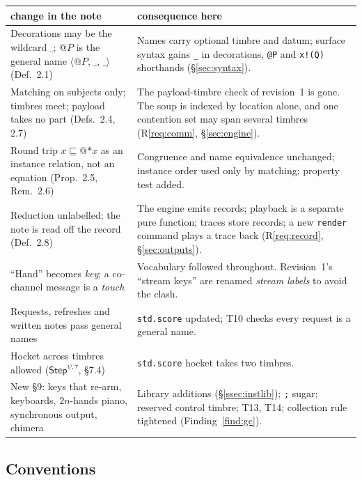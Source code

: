 \documentclass[11pt,a4paper]{article}
\makeatletter
\theoremstyle{definition}
\theoremstyle{remark}
\newcommand{\nm}[3]{\langle @#1,\,#2,\,#3\rangle}
\newcommand{\wild}{\_}
\newcommand{\gen}{\sqsubseteq}
\makeatother
\begin{document}
\begin{center}
\small
\begin{tabular}{@{}>{\raggedright\arraybackslash}p{5.3cm}>{\raggedright\arraybackslash}p{8.6cm}@{}}
\toprule
change in the note & consequence here \\
\midrule
Decorations may be the wildcard $\wild$; $@P$ is the general name
$\nm{P}{\wild}{\wild}$ (Def.~2.1) &
Names carry optional timbre and datum; surface syntax gains \texttt{\_} in
decorations, \texttt{@P} and \texttt{x!(Q)} shorthands (\S\ref{sec:syntax}). \\
Matching on subjects only; timbres meet; payload takes no part (Defs.~2.4,
2.7) &
The payload-timbre check of revision~1 is gone. The soup is indexed by location
alone, and one contention set may span several timbres (R\ref{req:comm},
\S\ref{sec:engine}). \\
Round trip $x \gen @{\ast x}$ as an instance relation, not an equation
(Prop.~2.5, Rem.~2.6) &
Congruence and name equivalence unchanged; instance order used only by
matching; property test added. \\
Reduction unlabelled; the note is read off the record (Def.~2.8) &
The engine emits records; playback is a separate pure function; traces store
records; a new \texttt{render} command plays a trace back
(R\ref{req:record}, \S\ref{sec:outputs}). \\
``Hand'' becomes \emph{key}; a co-channel message is a \emph{touch} &
Vocabulary followed throughout. Revision~1's ``stream keys'' are renamed
\emph{stream labels} to avoid the clash. \\
Requests, refreshes and written notes pass general names &
\texttt{std.score} updated; T10 checks every request is a general name. \\
Hocket across timbres allowed ($\mathsf{Step}^{\psi,\tau}$, \S7.4) &
\texttt{std.score} hocket takes two timbres. \\
New \S9: keys that re-arm, keyboards, $2n$-hands piano, synchronous output,
chimera &
Library additions (\S\ref{ssec:instlib}); \texttt{;} sugar; reserved control
timbre; T13, T14; collection rule tightened (Finding~\ref{find:gc}). \\
\bottomrule
\end{tabular}
\end{center}

\subsection{Conventions}
\end{document}
